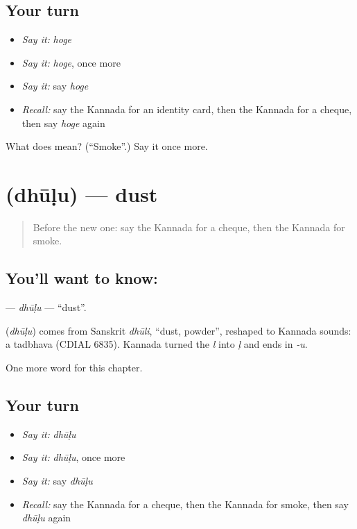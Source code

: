 \subsection*{Your turn}
\begin{itemize}
\raggedright
  \item \emph{Say it:} \emph{hoge}
  \item \emph{Say it:} \emph{hoge}, once more
  \item \emph{Say it:} say \emph{hoge}
  \item \emph{Recall:} say the Kannada for an identity card, then the Kannada for a cheque, then say \emph{hoge} again
\end{itemize}

\begin{tcolorbox}[breakable,colback=teal!4,colframe=teal!35!black,title={Before you move on}]
What does  mean? (\textquotedblleft{}Smoke\textquotedblright{}.) Say it once more.
\end{tcolorbox}
\section[\texorpdfstring{\kn{ಧೂಳು} (dhūḷu)}{ಧೂಳು (dhūḷu)}]{ (dhūḷu) — dust}

\label{lesson:KA-C224-dhulu}



\begin{quote}
Before the new one: say the Kannada for a cheque, then the Kannada for smoke.
\end{quote}

\subsection*{You'll want to know: }
\textbf{} — \emph{dhūḷu} — \textquotedblleft{}dust\textquotedblright{}.

\begin{cousinweb}
\textbf{} (\emph{dhūḷu}) comes from Sanskrit \emph{dhūli}, \textquotedblleft{}dust, powder\textquotedblright{}, reshaped to Kannada sounds: a tadbhava (CDIAL 6835). Kannada turned the \emph{l} into \emph{ḷ} and ends in \emph{-u}.
\end{cousinweb}

\begin{grammarlens}[title={What you've built}]
One more word for this chapter.
\end{grammarlens}

\subsection*{Your turn}
\begin{itemize}
\raggedright
  \item \emph{Say it:} \emph{dhūḷu}
  \item \emph{Say it:} \emph{dhūḷu}, once more
  \item \emph{Say it:} say \emph{dhūḷu}
  \item \emph{Recall:} say the Kannada for a cheque, then the Kannada for smoke, then say \emph{dhūḷu} again
\end{itemize}

